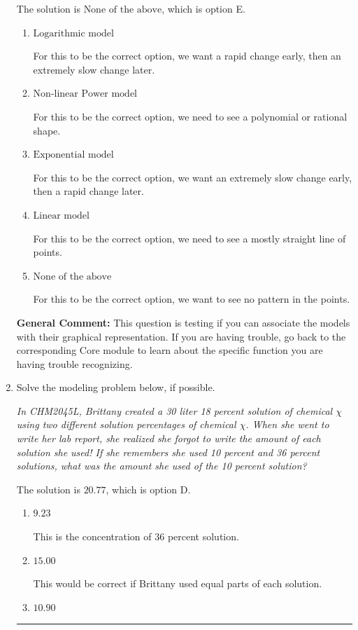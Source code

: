 \documentclass{extbook}[14pt]
\newcommand{\litem}[1]{\item #1

\rule{\textwidth}{0.4pt}}
\begin{document}
\begin{enumerate}
{The solution is \( \text{None of the above} \), which is option E.\begin{enumerate}[label=\Alph*.]
\item \( \text{Logarithmic model} \)

For this to be the correct option, we want a rapid change early, then an extremely slow change later.
\item \( \text{Non-linear Power model} \)

For this to be the correct option, we need to see a polynomial or rational shape.
\item \( \text{Exponential model} \)

For this to be the correct option, we want an extremely slow change early, then a rapid change later.
\item \( \text{Linear model} \)

For this to be the correct option, we need to see a mostly straight line of points.
\item \( \text{None of the above} \)

For this to be the correct option, we want to see no pattern in the points.
\end{enumerate}

\textbf{General Comment:} This question is testing if you can associate the models with their graphical representation. If you are having trouble, go back to the corresponding Core module to learn about the specific function you are having trouble recognizing.
}
\litem{
Solve the modeling problem below, if possible.

\begin{center}
    \textit{ In CHM2045L, Brittany created a 30 liter 18 percent solution of chemical $\chi$ using two different solution percentages of chemical $\chi$. When she went to write her lab report, she realized she forgot to write the amount of each solution she used! If she remembers she used 10 percent and 36 percent solutions, what was the amount she used of the 10 percent solution? }
\end{center}
The solution is \( 20.77 \), which is option D.\begin{enumerate}[label=\Alph*.]
\item \( 9.23 \)

This is the concentration of 36 percent solution.
\item \( 15.00 \)

This would be correct if Brittany used equal parts of each solution.
\item \( 10.90 \)


\end{enumerate}}
\end{enumerate}
\end{document}
